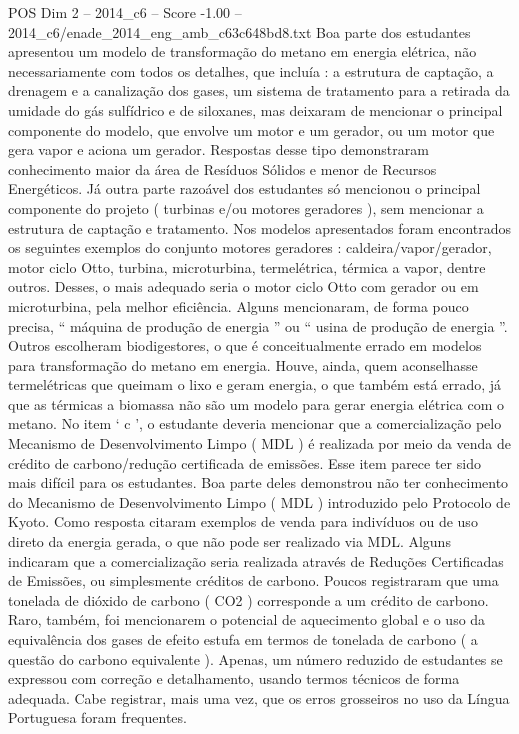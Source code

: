 \begin{textsample}{POS Dim 2 – 2014\_c6 – Score -1.00 – 2014\_c6/enade\_2014\_eng\_amb\_c63c648bd8.txt}
Boa parte dos estudantes apresentou um modelo de transformação do metano em energia elétrica, não necessariamente com todos os detalhes, que incluía : a estrutura de captação, a drenagem e a canalização dos gases, um sistema de tratamento para a retirada da umidade do gás sulfídrico e de siloxanes, mas deixaram de mencionar o principal componente do modelo, que envolve um motor e um gerador, ou um motor que gera vapor e aciona um gerador.
Respostas desse tipo demonstraram conhecimento maior da área de Resíduos Sólidos e menor de Recursos Energéticos.
Já outra parte razoável dos estudantes só mencionou o principal componente do projeto ( turbinas e/ou motores geradores ), sem mencionar a estrutura de captação e tratamento.
Nos modelos apresentados foram encontrados os seguintes exemplos do conjunto motores geradores : caldeira/vapor/gerador, motor ciclo Otto, turbina, microturbina, termelétrica, térmica a vapor, dentre outros.
Desses, o mais adequado seria o motor ciclo Otto com gerador ou em microturbina, pela melhor eficiência.
Alguns mencionaram, de forma pouco precisa, “ máquina de produção de energia ” ou “ usina de produção de energia ”.
Outros escolheram biodigestores, o que é conceitualmente errado em modelos para transformação do metano em energia.
Houve, ainda, quem aconselhasse termelétricas que queimam o lixo e geram energia, o que também está errado, já que as térmicas a biomassa não são um modelo para gerar energia elétrica com o metano.
No item ‘ c ’, o estudante deveria mencionar que a comercialização pelo Mecanismo de Desenvolvimento Limpo ( MDL ) é realizada por meio da venda de crédito de carbono/redução certificada de emissões.
Esse item parece ter sido mais difícil para os estudantes.
Boa parte deles demonstrou não ter conhecimento do Mecanismo de Desenvolvimento Limpo ( MDL ) introduzido pelo Protocolo de Kyoto.
Como resposta citaram exemplos de venda para indivíduos ou de uso direto da energia gerada, o que não pode ser realizado via MDL.
Alguns indicaram que a comercialização seria realizada através de Reduções Certificadas de Emissões, ou simplesmente créditos de carbono.
Poucos registraram que uma tonelada de dióxido de carbono ( CO2 ) corresponde a um crédito de carbono.
Raro, também, foi mencionarem o potencial de aquecimento global e o uso da equivalência dos gases de efeito estufa em termos de tonelada de carbono ( a questão do carbono equivalente ).
Apenas, um número reduzido de estudantes se expressou com correção e detalhamento, usando termos técnicos de forma adequada.
Cabe registrar, mais uma vez, que os erros grosseiros no uso da Língua Portuguesa foram frequentes.

\end{textsample}
